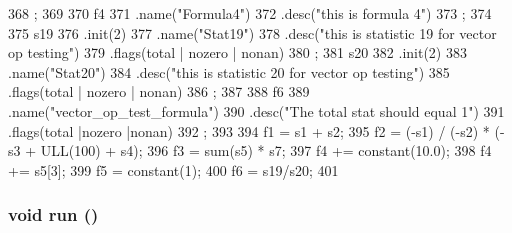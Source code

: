 \begin{DoxyCode}
{368         ;
369 
370     f4
371         .name("Formula4")
372         .desc("this is formula 4")
373         ;
374 
375     s19
376         .init(2)
377         .name("Stat19")
378         .desc("this is statistic 19 for vector op testing")
379         .flags(total | nozero | nonan)
380     ;
381     s20
382         .init(2)
383         .name("Stat20")
384         .desc("this is statistic 20 for vector op testing")
385         .flags(total | nozero | nonan)
386     ;
387 
388     f6
389         .name("vector_op_test_formula")
390         .desc("The total stat should equal 1")
391         .flags(total |nozero |nonan)
392         ;
393 
394     f1 = s1 + s2;
395     f2 = (-s1) / (-s2) * (-s3 + ULL(100) + s4);
396     f3 = sum(s5) * s7;
397     f4 += constant(10.0);
398     f4 += s5[3];
399     f5 = constant(1);
400     f6 = s19/s20;
401 }
\end{DoxyCode}
\hypertarget{structStatTest_a13a43e6d814de94978c515cb084873b1}{
\subsubsection[{run}]{\setlength{\rightskip}{0pt plus 5cm}void run ()}}
\label{structStatTest_a13a43e6d814de94978c515cb084873b1}



